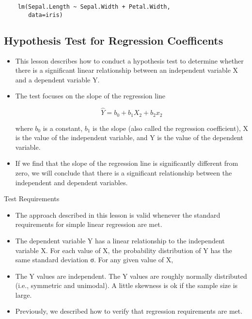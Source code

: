 \documentclass[a4paper,12pt]{article}
\begin{document}
\begin{framed}
	\begin{verbatim}
	lm(Sepal.Length ~ Sepal.Width + Petal.Width,
	   data=iris)
	\end{verbatim}
\end{framed}
\newpage
\newpage
\subsection*{Hypothesis Test for Regression Coefficents}
\begin{itemize}
\item 
This lesson describes how to conduct a hypothesis test to determine whether there is a significant linear relationship between an independent variable X and a dependent variable Y. 

\item The test focuses on the slope of the regression line

\[ \hat{Y} = b_0 + b_1X_2 + b_2x_2\]

where $b_0$ is a constant, $b_1$ is the slope (also called the regression coefficient), X is the value of the independent variable, and Y is the value of the dependent variable.

\item If we find that the slope of the regression line is significantly different from zero, we will conclude that there is a significant relationship between the independent and dependent variables.
\end{itemize}
Test Requirements
\begin{itemize}
\item The approach described in this lesson is valid whenever the standard requirements for simple linear regression are met.

\item The dependent variable Y has a linear relationship to the independent variable X.
For each value of X, the probability distribution of Y has the same standard deviation σ.
For any given value of X,

\item The Y values are independent.
The Y values are roughly normally distributed (i.e., symmetric and unimodal). A little skewness is ok if the sample size is large.
\item Previously, we described how to verify that regression requirements are met.

\end{itemize}
\end{document}
